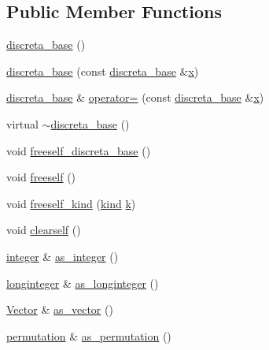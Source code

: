 \subsection*{Public Member Functions}
\begin{DoxyCompactItemize}
\item 
\mbox{\hyperlink{classdiscreta__base_a52f72e02c11c566c8a8389b662b6c50c}{discreta\+\_\+base}} ()
\item 
\mbox{\hyperlink{classdiscreta__base_a0cdb2756e70a71eccecd13727f4e8f99}{discreta\+\_\+base}} (const \mbox{\hyperlink{classdiscreta__base}{discreta\+\_\+base}} \&\mbox{\hyperlink{alphabet2_8_c_a6150e0515f7202e2fb518f7206ed97dc}{x}})
\item 
\mbox{\hyperlink{classdiscreta__base}{discreta\+\_\+base}} \& \mbox{\hyperlink{classdiscreta__base_a4ccf158b3864d95b4e85fa471c748bae}{operator=}} (const \mbox{\hyperlink{classdiscreta__base}{discreta\+\_\+base}} \&\mbox{\hyperlink{alphabet2_8_c_a6150e0515f7202e2fb518f7206ed97dc}{x}})
\item 
virtual \mbox{\hyperlink{classdiscreta__base_a14df6915d3622e941d8bd541a6818d0e}{$\sim$discreta\+\_\+base}} ()
\item 
void \mbox{\hyperlink{classdiscreta__base_a8b1ec2cee4566034441e066dc2c027db}{freeself\+\_\+discreta\+\_\+base}} ()
\item 
void \mbox{\hyperlink{classdiscreta__base_a9a3c9501a562293b5667c11b9174d6e5}{freeself}} ()
\item 
void \mbox{\hyperlink{classdiscreta__base_a63a23ada2165b3838fab719ed458cec8}{freeself\+\_\+kind}} (\mbox{\hyperlink{discreta_8h_aaf25ee7e2306d78c74ec7bc48f092e81}{kind}} \mbox{\hyperlink{classdiscreta__base_a6f7a0f7bdd115b9e4dde358cfa7ebf81}{k}})
\item 
void \mbox{\hyperlink{classdiscreta__base_acc3985eac311491ab6ea3e409cffd3c4}{clearself}} ()
\item 
\mbox{\hyperlink{classinteger}{integer}} \& \mbox{\hyperlink{classdiscreta__base_a00d7691eaf874fd283d942692fe8dd26}{as\+\_\+integer}} ()
\item 
\mbox{\hyperlink{classlonginteger}{longinteger}} \& \mbox{\hyperlink{classdiscreta__base_a20a094639eb711b10c8694c51937f7cd}{as\+\_\+longinteger}} ()
\item 
\mbox{\hyperlink{class_vector}{Vector}} \& \mbox{\hyperlink{classdiscreta__base_a7bdd6cae39c380b128ee9e17e42cf020}{as\+\_\+vector}} ()
\item 
\mbox{\hyperlink{classpermutation}{permutation}} \& \mbox{\hyperlink{classdiscreta__base_aa4e72f36a82984239b12ae831e131098}{as\+\_\+permutation}} ()

\end{DoxyCompactItemize}
